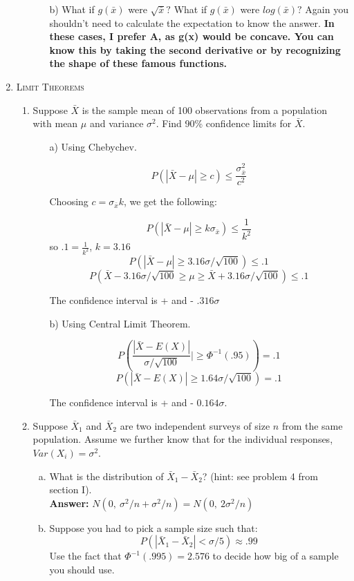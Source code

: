 \documentclass[11pt,letterpaper]{article}
\numberwithin{equation}{section}
\begin{document}
\begin{enumerate}[I]
\begin{enumerate}[1)]
\begin{enumerate}
\item[b)] What if $g(\bar{x})$ were $\sqrt{\bar{x}}?$ What if $g(\bar{x})$ were $log(\bar{x})?$  Again you shouldn't need to calculate the expectation to know the answer. \textbf{In these cases, I prefer A, as g(x) would be concave.  You can know this by taking the second derivative or by recognizing the shape of these famous functions.}
\end{enumerate}
\end{enumerate}


\item \textsc{Limit Theorems} 

\begin{enumerate}[1)]

\item Suppose $\bar{X}$ is the sample mean of 100 observations from a population with mean $\mu$ and variance $\sigma^2$.  Find 90\% confidence limits for $\bar{X}$.
\begin{enumerate}
\item[a)] Using Chebychev.

$$P(|\bar{X}-\mu|\geq c )\leq \frac{\sigma^2_{\bar{x}}}{c^2}$$

Choosing $c=\sigma_{\bar{x}}k$, we get the following:

$$P(|\bar{X}-\mu|\geq k\sigma_{\bar{x}} )\leq \frac{1}{k^2}$$
so $.1=\frac{1}{k^2}$, $k=3.16$
$$P(|\bar{X}-\mu|\geq 3.16\sigma/\sqrt{100} )\leq .1$$
$$P(\bar{X}-3.16\sigma/\sqrt{100} \geq \mu \geq \bar{X}+3.16\sigma/\sqrt{100})\leq .1$$

The confidence interval is + and - $.316\sigma$
\item[b)] Using Central Limit Theorem.

$$P(\frac{|\bar{X}-E(X)|}{\sigma/\sqrt{100}}|\geq \Phi^{-1}(.95))=.1$$
$$P(|\bar{X}-E(X)|\geq 1.64 \sigma/\sqrt{100})=.1$$

The confidence interval is + and - $0.164\sigma$.

\end{enumerate}

\item Suppose $\bar{X}_1$ and $\bar{X}_2$ are two independent surveys of size $n$ from the same population.  Assume we further know that for the individual responses, $Var(X_i)=\sigma^2$.
\begin{enumerate}[a)]
\item What is the distribution of $\bar{X}_1-\bar{X}_2$? (hint: see problem 4 from section I). \\  \textbf{Answer:} $N( 0,\ \sigma^2/n+\sigma^2/n)= N( 0,\ 2\sigma^2/n)$
\item Suppose you had to pick a sample size such that: $$P(|\bar{X}_1-\bar{X}_2| < \sigma/5) \approx .99$$
 Use the fact that $\Phi^{-1}(.995)=2.576$ to decide how big of a sample you should use.
 

\end{enumerate}
\end{enumerate}
\end{enumerate}
\end{document}

